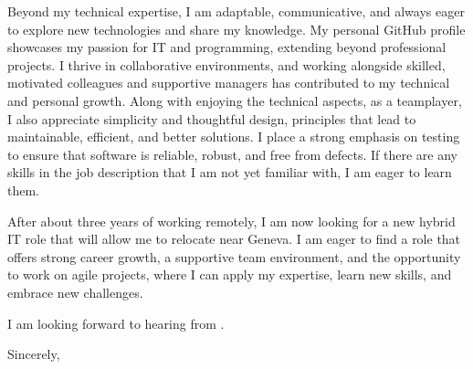 \documentclass[10pt, a4paper]{article}
\begin{document}
Beyond my technical expertise, I am adaptable, communicative, and always eager to explore new technologies and share my knowledge. My personal GitHub profile showcases my passion for IT and programming, extending beyond professional projects. I thrive in collaborative environments, and working alongside skilled, motivated colleagues and supportive managers has contributed to my technical and personal growth. Along with enjoying the technical aspects, as a teamplayer, I also appreciate simplicity and thoughtful design, principles that lead to maintainable, efficient, and better solutions. I place a strong emphasis on testing to ensure that software is reliable, robust, and free from defects. If there are any skills in the job description that I am not yet familiar with, I am eager to learn them.

After about three years of working remotely, I am now looking for a new hybrid IT role that will allow me to relocate near Geneva. I am eager to find a role that offers strong career growth, a supportive team environment, and the opportunity to work on agile projects, where I can apply my expertise, learn new skills, and embrace new challenges.

I am looking forward to hearing from \COMPANY. 

\bigskip

Sincerely,

\vspace{20pt}

\name
\end{document}
